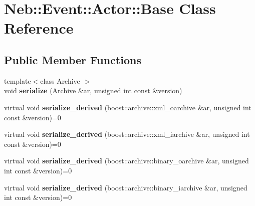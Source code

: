\hypertarget{classNeb_1_1Event_1_1Actor_1_1Base}{\section{Neb\-:\-:Event\-:\-:Actor\-:\-:Base Class Reference}
\label{classNeb_1_1Event_1_1Actor_1_1Base}
}
\subsection*{Public Member Functions}
\begin{DoxyCompactItemize}
\item 
\hypertarget{classNeb_1_1Event_1_1Actor_1_1Base_a7e63345e09aa9a83dc10804d99759d6a}{{\footnotesize template$<$class Archive $>$ }\\void {\bfseries serialize} (Archive \&ar, unsigned int const \&version)}\label{classNeb_1_1Event_1_1Actor_1_1Base_a7e63345e09aa9a83dc10804d99759d6a}

\item 
\hypertarget{classNeb_1_1Event_1_1Actor_1_1Base_aa9cf29e608e5367af1006ceec717bbab}{virtual void {\bfseries serialize\-\_\-derived} (boost\-::archive\-::xml\-\_\-oarchive \&ar, unsigned int const \&version)=0}\label{classNeb_1_1Event_1_1Actor_1_1Base_aa9cf29e608e5367af1006ceec717bbab}

\item 
\hypertarget{classNeb_1_1Event_1_1Actor_1_1Base_ac4cc97711ed27e265ca977b89fa613e8}{virtual void {\bfseries serialize\-\_\-derived} (boost\-::archive\-::xml\-\_\-iarchive \&ar, unsigned int const \&version)=0}\label{classNeb_1_1Event_1_1Actor_1_1Base_ac4cc97711ed27e265ca977b89fa613e8}

\item 
\hypertarget{classNeb_1_1Event_1_1Actor_1_1Base_a41a75cb7ea7fc0bf463f2803ba3efa32}{virtual void {\bfseries serialize\-\_\-derived} (boost\-::archive\-::binary\-\_\-oarchive \&ar, unsigned int const \&version)=0}\label{classNeb_1_1Event_1_1Actor_1_1Base_a41a75cb7ea7fc0bf463f2803ba3efa32}

\item 
\hypertarget{classNeb_1_1Event_1_1Actor_1_1Base_a501859262708f2c72cf1a0bd20d803c7}{virtual void {\bfseries serialize\-\_\-derived} (boost\-::archive\-::binary\-\_\-iarchive \&ar, unsigned int const \&version)=0}\label{classNeb_1_1Event_1_1Actor_1_1Base_a501859262708f2c72cf1a0bd20d803c7}

\end{DoxyCompactItemize}
